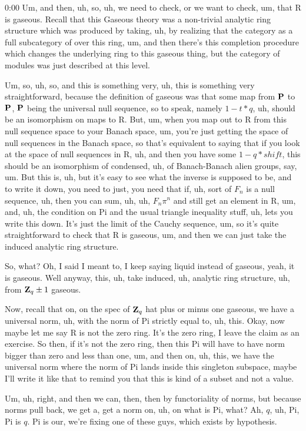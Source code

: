\begin{unfinished}{0:00}
Um, and then, uh, so, uh, we need to check, or we want to check, um, that R is gaseous. Recall that this Gaseous theory was a non-trivial analytic ring structure which was produced by taking, uh, by realizing that the category as a full subcategory of over this ring, um, and then there's this completion procedure which changes the underlying ring to this gaseous thing, but the category of modules was just described at this level.

Um, so, uh, so, and this is something very, uh, this is something very straightforward, because the definition of gaseous was that some map from $\P$ to $\P$, $\P$ being the universal null sequence, so to speak, namely $1 - t * q$, uh, should be an isomorphism on maps to R. But, um, when you map out to R from this null sequence space to your Banach space, um, you're just getting the space of null sequences in the Banach space, so that's equivalent to saying that if you look at the space of null sequences in R, uh, and then you have some $1 - q * shift$, this should be an isomorphism of condensed, uh, of Banach-Banach alien groups, say, um. But this is, uh, but it's easy to see what the inverse is supposed to be, and to write it down, you need to just, you need that if, uh, sort of $F_n$ is a null sequence, uh, then you can sum, uh, uh, $F_n \pi^n$ and still get an element in R, um, and, uh, the condition on Pi and the usual triangle inequality stuff, uh, lets you write this down. It's just the limit of the Cauchy sequence, um, so it's quite straightforward to check that R is gaseous, um, and then we can just take the induced analytic ring structure.

So, what? Oh, I said I meant to, I keep saying liquid instead of gaseous, yeah, it is gaseous. Well anyway, this, uh, take induced, uh, analytic ring structure, uh, from $\Z_q \pm 1$ gaseous.

Now, recall that on, on the spec of $\Z_q$ hat plus or minus one gaseous, we have a universal norm, uh, with the norm of Pi strictly equal to, uh, this. Okay, now maybe let me say R is not the zero ring. It's the zero ring, I leave the claim as an exercise. So then, if it's not the zero ring, then this Pi will have to have norm bigger than zero and less than one, um, and then on, uh, this, we have the universal norm where the norm of Pi lands inside this singleton subspace, maybe I'll write it like that to remind you that this is kind of a subset and not a value.

Um, uh, right, and then we can, then, then by functoriality of norms, but because norms pull back, we get a, get a norm on, uh, on what is Pi, what? Ah, $q$, uh, Pi, Pi is $q$. Pi is our, we're fixing one of these guys, which exists by hypothesis.


\end{unfinished}
